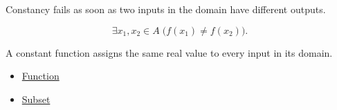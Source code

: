 \begin{remark*}
Constancy fails as soon as two inputs in the domain have different outputs.
\end{remark*}

\begin{remark*}
\[
  \exists x_1,x_2\in A\;\bigl(f(x_1)\neq f(x_2)\bigr).
\]
\end{remark*}

\begin{remark*}[Interpretation]
A constant function assigns the same real value to every input in its domain.
\end{remark*}

\begin{dependencies}
\begin{itemize}
  \item \hyperref[def:function]{Function}
  \item \hyperref[def:subset]{Subset}
\end{itemize}
\end{dependencies}
